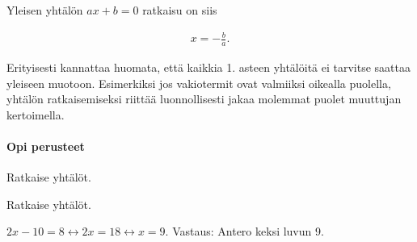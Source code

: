 Yleisen yhtälön $ax + b = 0$ ratkaisu on siis

\begin{align*}
  x = -\frac{b}{a}.
\end{align*}

Erityisesti kannattaa huomata, että kaikkia 1. asteen yhtälöitä ei tarvitse
saattaa yleiseen muotoon. Esimerkiksi jos vakiotermit ovat valmiiksi
oikealla puolella, yhtälön ratkaisemiseksi riittää luonnollisesti jakaa
molemmat puolet muuttujan kertoimella.

\begin{tehtavasivu}

\paragraph*{Opi perusteet}

\begin{tehtava}
    Ratkaise yhtälöt.
    \begin{alakohdat}
    \end{alakohdat}
    \begin{vastaus}
        \begin{alakohdat}
        \end{alakohdat}
    \end{vastaus}
\end{tehtava}

\begin{tehtava}
    Ratkaise yhtälöt.
    \begin{alakohdat}
    \end{alakohdat}
    \begin{vastaus}
        \begin{alakohdat}
        \end{alakohdat}
    \end{vastaus}
\end{tehtava}

\begin{tehtava}
    \begin{vastaus}
        $2x-10=8 \leftrightarrow 2x=18 \leftrightarrow x=9$. Vastaus: Antero keksi luvun 9.
    \end{vastaus}
\end{tehtava}


\end{tehtavasivu}
